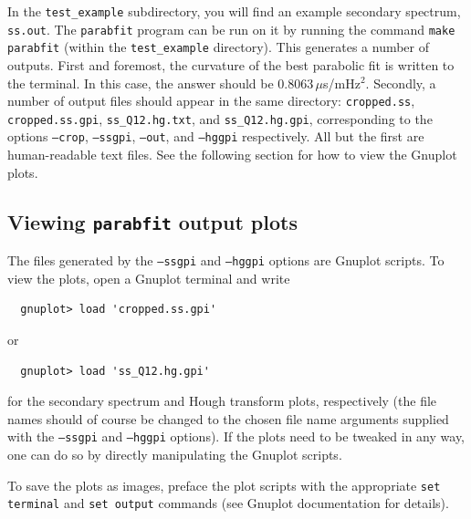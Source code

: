 \documentclass{article}
\newcommand{\parabfit}{\texttt{parabfit}}
\begin{document}
In the \texttt{test\_example} subdirectory, you will find an example secondary spectrum, \texttt{ss.out}.
The \parabfit{} program can be run on it by running the command \texttt{make parabfit} (within the \texttt{test\_example} directory).
This generates a number of outputs.
First and foremost, the curvature of the best parabolic fit is written to the terminal. In this case, the answer should be $0.8063\,\mu$s/mHz$^2$.
Secondly, a number of output files should appear in the same directory: \texttt{cropped.ss}, \texttt{cropped.ss.gpi}, \texttt{ss\_Q12.hg.txt}, and \texttt{ss\_Q12.hg.gpi}, corresponding to the options \texttt{--crop}, \texttt{--ssgpi}, \texttt{--out}, and \texttt{--hggpi} respectively.
All but the first are human-readable text files.
See the following section for how to view the Gnuplot plots.

\subsection{Viewing \parabfit{} output plots}

The files generated by the \texttt{--ssgpi} and \texttt{--hggpi} options are Gnuplot scripts.
To view the plots, open a Gnuplot terminal and write
\begin{lstlisting}
  gnuplot> load 'cropped.ss.gpi'
\end{lstlisting}
or
\begin{lstlisting}
  gnuplot> load 'ss_Q12.hg.gpi'
\end{lstlisting}
for the secondary spectrum and Hough transform plots, respectively (the file names should of course be changed to the chosen file name arguments supplied with the \texttt{--ssgpi} and \texttt{--hggpi} options).
If the plots need to be tweaked in any way, one can do so by directly manipulating the Gnuplot scripts.

To save the plots as images, preface the plot scripts with the appropriate \texttt{set terminal} and \texttt{set output} commands (see Gnuplot documentation for details).
\end{document}
